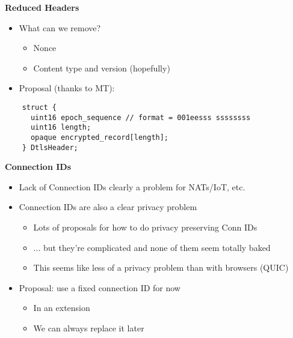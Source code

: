 \documentclass[helvetica]{seminar}
\newcommand{\heading}[1]{%
  \begin{center} 
    \large\bf 
    #1 
  \end{center} 
  \vspace{.4 in}}
\begin{document}
\begin{slide}
  \heading{Reduced Headers}

  \begin{itemize}
  \item What can we remove?
    \begin{itemize}
    \item Nonce
    \item Content type and version (hopefully)
    \end{itemize}

  \item Proposal (thanks to MT):
  \end{itemize}

  {\footnotesize
\begin{verbatim}
    struct {
      uint16 epoch_sequence // format = 001eesss ssssssss
      uint16 length;
      opaque encrypted_record[length];
    } DtlsHeader;
\end{verbatim}
}

\end{slide}


\begin{slide}
  \heading{Connection IDs}

  \begin{itemize}
  \item Lack of Connection IDs clearly a problem for NATs/IoT, etc.
  \item Connection IDs are also a clear privacy problem
    \begin{itemize}
    \item Lots of proposals for how to do privacy preserving Conn IDs
    \item ... but they're complicated and none of them seem totally baked
    \item This seems like less of a privacy problem than with browsers (QUIC)     
    \end{itemize}

  \item Proposal: use a fixed connection ID for now
    \begin{itemize}
      \item In an extension
      \item We can always replace it later
    \end{itemize}
  \end{itemize}
\end{slide}
\end{document}
